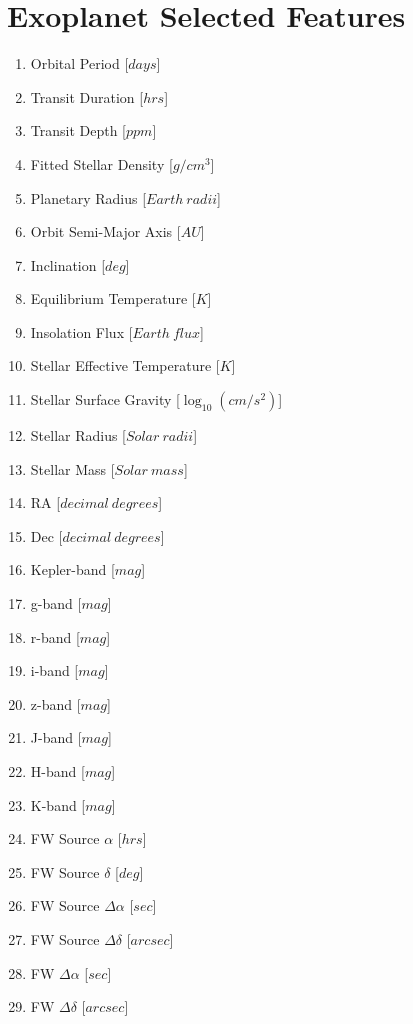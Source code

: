 \documentclass[11pt, a4paper]{article}
\begin{document}
\clearpage
\appendix
\appendixpage

\section{Exoplanet Selected Features}
  \begin{multicols}{2}
    \label{appendix:features}
    \begin{enumerate}
      \item Orbital Period [$days$]
      \item Transit Duration [$hrs$]
      \item Transit Depth [$ppm$]
      \item Fitted Stellar Density [$g/cm^{3}$]
      \item Planetary Radius [$Earth\:radii$]
      \item Orbit Semi-Major Axis [$AU$]
      \item Inclination [$deg$]
      \item Equilibrium Temperature [$K$]
      \item Insolation Flux [$Earth\:flux$]
      \item Stellar Effective Temperature [$K$]
      \item Stellar Surface Gravity [$\log_{10}(cm/s^{2})$]
      \item Stellar Radius [$Solar\:radii$]
      \item Stellar Mass [$Solar\:mass$]
      \item RA [$decimal\:degrees$]
      \item Dec [$decimal\:degrees$]
      \item Kepler-band [$mag$]
      \item g-band [$mag$]
      \item r-band [$mag$]
      \item i-band [$mag$]
      \item z-band [$mag$]
      \item J-band [$mag$]
      \item H-band [$mag$]
      \item K-band [$mag$]
      \item FW Source $\alpha$ [$hrs$]
      \item FW Source $\delta$ [$deg$]
      \item FW Source $\Delta\alpha$ [$sec$]
      \item FW Source $\Delta\delta$ [$arcsec$]
      \item FW $\Delta\alpha$ [$sec$]
      \item FW $\Delta\delta$ [$arcsec$]
    \end{enumerate}
  \end{multicols}
\end{document}
